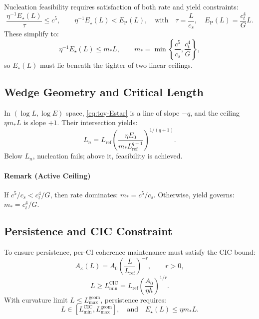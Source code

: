 \documentclass[preprints,article,submit,pdftex,moreauthors]{Definitions/mdpi}
\begin{document}
Nucleation feasibility requires satisfaction of both rate and yield constraints:
\begin{equation}
\frac{\eta^{-1} E_\star(L)}{\tau} \le c^5, \qquad \eta^{-1} E_\star(L) < E_{\mathrm{P}}(L),
\quad \text{with} \quad \tau = \frac{L}{c_s}, \quad E_{\mathrm{P}}(L) = \frac{c_t^4}{G} L.
\label{eq:toy-bounds}
\end{equation}
These simplify to:
\begin{equation}
\eta^{-1} E_\star(L) \le m_\ast L,
\qquad m_\ast = \min\left\{ \frac{c^5}{c_s}, \frac{c_t^4}{G} \right\},
\label{eq:mstar}
\end{equation}
so \( E_\star(L) \) must lie beneath the tighter of two linear ceilings.

\subsection[\appendixname~\thesubsection]{Wedge Geometry and Critical Length}
In \((\log L, \log E)\) space, \eqref{eq:toy-Estar} is a line of slope \(-q\), and the ceiling \( \eta m_\ast L \) is slope \(+1\). Their intersection yields:
\begin{equation}
L_n = L_{\mathrm{ref}} \left( \frac{\eta E_0}{m_\ast L_{\mathrm{ref}}^{q+1}} \right)^{1/(q+1)}.
\label{eq:Ln}
\end{equation}
Below \( L_n \), nucleation fails; above it, feasibility is achieved.

\paragraph*{Remark (Active Ceiling)}
If \( c^5/c_s < c_t^4/G \), then rate dominates: \( m_\ast = c^5/c_s \). Otherwise, yield governs: \( m_\ast = c_t^4/G \).

\subsection[\appendixname~\thesubsection]{Persistence and CIC Constraint}
To ensure persistence, per-CI coherence maintenance must satisfy the CIC bound:
\begin{equation}
A_\kappa(L) = A_0 \left(\frac{L}{L_{\mathrm{ref}}}\right)^{-r}, \qquad r > 0,
\end{equation}
\begin{equation}
L \ge L_{\min}^{\mathrm{CIC}} = L_{\mathrm{ref}} \left( \frac{A_0}{\eta h} \right)^{1/r}.
\label{eq:LminCIC}
\end{equation}
With curvature limit \( L \le L_{\max}^{\mathrm{geom}} \), persistence requires:
\begin{equation}
L \in \left[ L_{\min}^{\mathrm{CIC}}, L_{\max}^{\mathrm{geom}} \right], \quad \text{and} \quad E_\star(L) \le \eta m_\ast L.
\end{equation}
\end{document}
